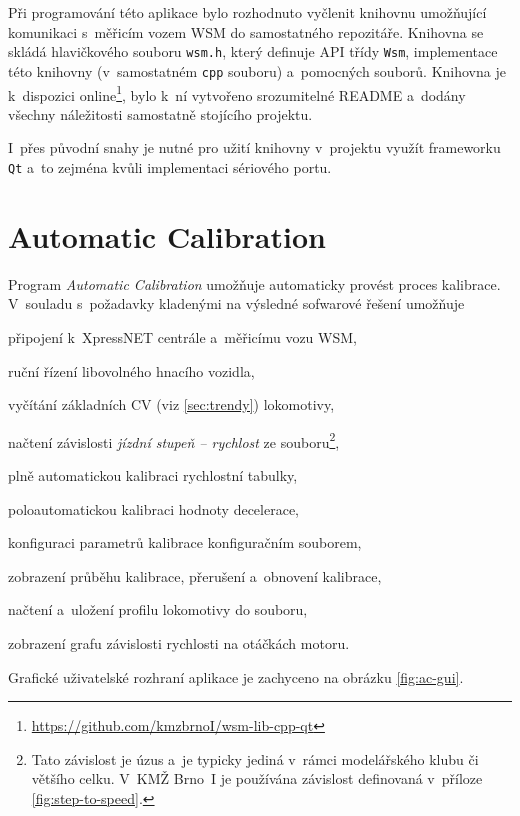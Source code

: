 Při programování této aplikace bylo rozhodnuto vyčlenit knihovnu umožňující
komunikaci s~měřicím vozem \gls{WSM} do samostatného repozitáře. Knihovna se skládá
hlavičkového souboru \texttt{wsm.h}, který definuje API třídy \texttt{Wsm},
implementace této knihovny (v~samostatném \texttt{cpp} souboru) a~pomocných
souborů. Knihovna je k~dispozici
online\footnote{\url{https://github.com/kmzbrnoI/wsm-lib-cpp-qt}}, bylo k~ní
vytvořeno srozumitelné README a~dodány všechny náležitosti samostatně stojícího
projektu.

I~přes původní snahy je nutné pro užití knihovny v~projektu využít frameworku
\texttt{Qt} a~to zejména kvůli implementaci sériového portu.


\newpage
\section{Automatic Calibration}
\label{sec:sw-wsm-auto-calib}

Program \textit{Automatic Calibration} umožňuje automaticky provést proces
kalibrace. V~souladu s~požadavky kladenými na výsledné sofwarové řešení
umožňuje

\begin{compactitem}
\item připojení k~XpressNET centrále a~měřicímu vozu \gls{WSM},
\item ruční řízení libovolného hnacího vozidla,
\item vyčítání základních \gls{CV} (viz \ref{sec:trendy}) lokomotivy,
\item načtení závislosti \textit{jízdní stupeň -- rychlost} ze
souboru\footnote{Tato závislost je úzus a~je typicky jediná v~rámci
modelářského klubu či většího celku. V~KMŽ Brno~I je používána závislost
definovaná v~příloze \ref{fig:step-to-speed}.},
\item plně automatickou kalibraci rychlostní tabulky,
\item poloautomatickou kalibraci hodnoty decelerace,
\item konfiguraci parametrů kalibrace konfiguračním souborem,
\item zobrazení průběhu kalibrace, přerušení a~obnovení kalibrace,
\item načtení a~uložení profilu lokomotivy do souboru,
\item zobrazení grafu závislosti rychlosti na otáčkách motoru.
\end{compactitem}

Grafické uživatelské rozhraní aplikace je zachyceno na obrázku \ref{fig:ac-gui}.

